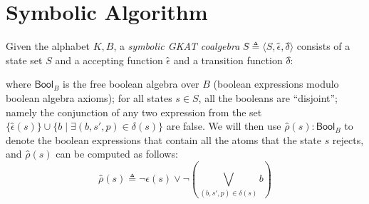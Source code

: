 \documentclass[conference]{IEEEtran}
\newtheorem{remark}[definition]{Remark}
\newcommand{\theoryOf}[1]{\ensuremath{\mathsf{#1}}}
\newcommand{\Bool}{\theoryOf{Bool}}
\begin{document}



\section{Symbolic Algorithm}

Given the alphabet \(K, B\), a \emph{symbolic GKAT coalgebra} \(Ŝ ≜ ⟨S, ϵ̂, δ̂⟩\) consists of a state set \(S\) and a accepting function \(ϵ̂\) and a transition function \(δ̂\):
where \(\Bool_B\) is the free boolean algebra over \(B\) (boolean expressions modulo boolean algebra axioms); for all states \(s ∈ S\), all the booleans are ``disjoint''; namely the conjunction of any two expression from the set \(\{ϵ̂(s)\} ∪ \{b ∣ ∃ (b, s', p) ∈ δ(s)\}\) are false. 
We will then use \(ρ̂(s): \Bool_B\) to denote the boolean expressions that contain all the atoms that the state \(s\) rejects, and \(ρ̂(s)\) can be computed as follows:
\[ρ̂(s) ≜ ¬ ϵ̂(s) ∨ ¬ \left( ⋁_{(b, s', p) ∈ δ(s)} b \right)\]
\end{document}
